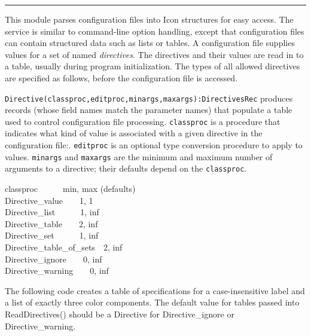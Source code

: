 \vspace{0.25cm}\hrule{}

This module parses configuration files into Icon
structures for easy access. The service is similar to 
command-line option handling, except that configuration files can
contain structured data such as lists or tables. A configuration file
supplies values for a set of named \textit{directives}. The directives
and their values are read in to a table, usually during program
initialization. The types of all allowed directives are specified as
follows, before the configuration file is accessed.

\texttt{Directive(classproc,editproc,minargs,maxargs):DirectivesRec}
produces records (whose field names match the parameter names) that
populate a table used to control configuration file processing.
\texttt{classproc} is a procedure that indicates what kind of value is
associated with a given directive in the configuration file:.
\texttt{editproc} is an optional type conversion procedure to apply to
values. \texttt{minargs} and \texttt{maxargs} are the minimum and
maximum number of arguments to a directive; their defaults depend on
the \texttt{classproc}.

classproc\ \ \ \ \ \ min, max (defaults)\\
Directive\_value\ \ \ \ 1, 1\\
Directive\_list\ \ \ \ \ \ 1, inf\ \ \ \ \\
Directive\_table\ \ \ \ 2, inf\\
Directive\_set\ \ \ \ \ \ 1, inf\\
Directive\_table\_of\_sets\ \ 2, inf\\
Directive\_ignore\ \ \ \ 0, inf\\
Directive\_warning\ \ \ \ 0, inf

The following code creates a table of specifications for a
case-insensitive label and a list of exactly three color components.
The default value for tables passed into \textsf{ReadDirectives()}
should be a \textsf{Directive} for \textsf{Directive\_ignore} or
\textsf{Directive\_warning}.


